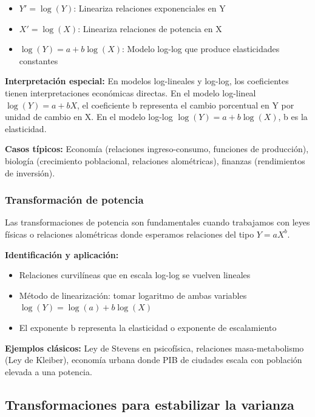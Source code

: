 \documentclass[
  letterpaper,
  DIV=11,
  numbers=noendperiod]{scrreprt}
\providecommand{\tightlist}{%
  \setlength{\itemsep}{0pt}\setlength{\parskip}{0pt}}
\begin{document}
\begin{itemize}
\tightlist
\item
  \(Y' = \log(Y)\): Lineariza relaciones exponenciales en Y
\item
  \(X' = \log(X)\): Lineariza relaciones de potencia en X\\
\item
  \(\log(Y) = a + b\log(X)\): Modelo log-log que produce elasticidades
  constantes
\end{itemize}

\textbf{Interpretación especial:} En modelos log-lineales y log-log, los
coeficientes tienen interpretaciones económicas directas. En el modelo
log-lineal \(\log(Y) = a + bX\), el coeficiente b representa el cambio
porcentual en Y por unidad de cambio en X. En el modelo log-log
\(\log(Y) = a + b\log(X)\), b es la elasticidad.

\textbf{Casos típicos:} Economía (relaciones ingreso-consumo, funciones
de producción), biología (crecimiento poblacional, relaciones
alométricas), finanzas (rendimientos de inversión).

\subsubsection{Transformación de
potencia}\label{transformaciuxf3n-de-potencia}

Las transformaciones de potencia son fundamentales cuando trabajamos con
leyes físicas o relaciones alométricas donde esperamos relaciones del
tipo \(Y = aX^b\).

\textbf{Identificación y aplicación:}

\begin{itemize}
\tightlist
\item
  Relaciones curvilíneas que en escala log-log se vuelven lineales
\item
  Método de linearización: tomar logaritmo de ambas variables
  \(\log(Y) = \log(a) + b\log(X)\)
\item
  El exponente b representa la elasticidad o exponente de escalamiento
\end{itemize}

\textbf{Ejemplos clásicos:} Ley de Stevens en psicofísica, relaciones
masa-metabolismo (Ley de Kleiber), economía urbana donde PIB de ciudades
escala con población elevada a una potencia.

\subsection{Transformaciones para estabilizar la
varianza}\label{transformaciones-para-estabilizar-la-varianza}
\end{document}
